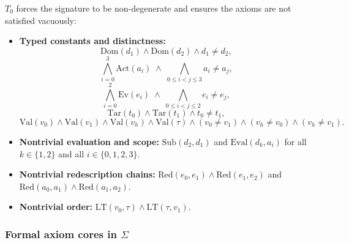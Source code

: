 \documentclass[12pt]{article}
\begin{document}
$T_0$ forces the signature to be non-degenerate and ensures the axioms are not satisfied vacuously:
\begin{itemize}[leftmargin=2.2em]
\item \textbf{Typed constants and distinctness:}
\[
\mathrm{Dom}(d_1)\wedge \mathrm{Dom}(d_2)\wedge d_1\neq d_2,
\]
\[
\bigwedge_{i=0}^3 \mathrm{Act}(a_i)\;\wedge\; \bigwedge_{0\le i<j\le 3} a_i\neq a_j,
\]
\[
\bigwedge_{i=0}^2 \mathrm{Ev}(e_i)\;\wedge\; \bigwedge_{0\le i<j\le 2} e_i\neq e_j,
\]
\[
\mathrm{Tar}(t_0)\wedge \mathrm{Tar}(t_1)\wedge t_0\neq t_1,
\]
\[
\mathrm{Val}(v_0)\wedge \mathrm{Val}(v_1)\wedge \mathrm{Val}(v_h)\wedge \mathrm{Val}(\tau)\wedge (v_0\neq v_1)\wedge (v_h\neq v_0)\wedge (v_h\neq v_1).
\]
\item \textbf{Nontrivial evaluation and scope:} $\mathrm{Sub}(d_2,d_1)$ and $\mathrm{Eval}(d_k,a_i)$ for all $k\in\{1,2\}$ and all $i\in\{0,1,2,3\}$.
\item \textbf{Nontrivial redescription chains:} $\mathrm{Red}(e_0,e_1)\wedge \mathrm{Red}(e_1,e_2)$ and $\mathrm{Red}(a_0,a_1)\wedge \mathrm{Red}(a_1,a_2)$.
\item \textbf{Nontrivial order:} $\mathrm{LT}(v_0,\tau)\wedge \mathrm{LT}(\tau,v_1)$.
\end{itemize}

\subsubsection{Formal axiom cores in \texorpdfstring{$\Sigma$}{Sigma}}
\end{document}

